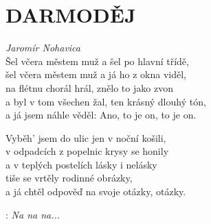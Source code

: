 \section*{\Huge DARMODĚJ}
\emph{Jaromír Nohavica}\\

Šel včera městem muž a šel po hlavní třídě,\\
šel včera městem muž a já ho z okna viděl,\\
na flétnu chorál hrál, znělo to jako zvon\\
a byl v tom všechen žal, ten krásný dlouhý tón,\\
a já jsem náhle věděl: Ano, to je on, to je on.\\

\begin{large}

Vyběh' jsem do ulic jen v noční košili,\\
v odpadcích z popelnic krysy se honily\\
a v teplých postelích lásky i nelásky\\
tiše se vrtěly rodinné obrázky,\\
a já chtěl odpověď na svoje otázky, otázky.\\

\end{large}

\textregistered:  \emph{Na na na...}\\


